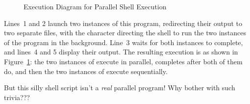 \begin{figure}[tb]
\begin{center}
\end{center}
\caption{Execution Diagram for Parallel Shell Execution}
\label{fig:intro:Execution Diagram for Parallel Shell Execution}
\end{figure}

Lines~1 and 2 launch two instances of this program, redirecting their
output to two separate files, with the \co{&} character directing the
shell to run the two instances of the program in the background.
Line~3 waits for both instances to complete, and lines~4 and 5
display their output.
The resulting execution is as shown in
Figure~\ref{fig:intro:Execution Diagram for Parallel Shell Execution}:
the two instances of  execute in parallel,
 completes after both of them do, and then the two instances
of  execute sequentially.

\QuickQuiz{}
	But this silly shell script isn't a \emph{real} parallel program!
	Why bother with such trivia???
 \QuickQuizEnd

